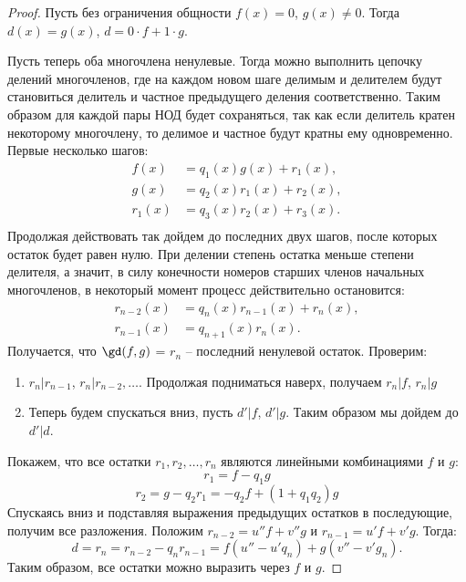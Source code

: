\begin{proof}
    Пусть без ограничения общности $f(x) = 0$, $g(x) \neq 0$. Тогда $d(x) = g(x)$, $d = 0\cdot f + 1\cdot g$.

    Пусть теперь оба многочлена ненулевые. Тогда можно выполнить цепочку делений многочленов, где 
    на каждом новом шаге делимым и делителем будут становиться делитель и частное предыдущего деления
    соответственно. Таким образом для каждой пары НОД будет сохраняться, так как если делитель кратен 
    некоторому многочлену, то делимое и частное будут кратны ему одновременно. Первые несколько шагов:
    \begin{align*}
        f(x)   & = q_1(x)g(x) + r_1(x), \\
        g(x)   & = q_2(x)r_1(x) + r_2(x), \\
        r_1(x) & = q_3(x)r_2(x) + r_3(x). \\
    \end{align*}
    Продолжая действовать так дойдем до последних двух шагов, после которых остаток будет равен нулю.
    При делении степень остатка меньше степени делителя, а значит, в силу конечности номеров старших 
    членов начальных многочленов, в некоторый момент процесс действительно остановится:
    \begin{align*}
        r_{n-2}(x) & = q_n(x)r_{n-1}(x) + r_n(x), \\
        r_{n-1}(x) & = q_{n+1}(x)r_{n}(x).
    \end{align*}
    Получается, что $\gd(f, g)$ = $r_n$ -- последний ненулевой остаток. Проверим:
    \begin{enumerate}
        \item $r_n \vert r_{n-1}$, $r_n \vert r_{n-2}, \ldots$. 
        Продолжая подниматься наверх, получаем $r_n \vert f$, $r_n \vert g$
        \item Теперь будем спускаться вниз, пусть $d' \vert f$, $d' \vert g$. 
        Таким образом мы дойдем до $d' \vert d$.
    \end{enumerate}
    Покажем, что все остатки $r_1, r_2, \ldots, r_n$ являются линейными комбинациями $f$ и $g$:
    $$r_1 = f - q_1g$$
    $$r_2 = g - q_2r_1 = -q_2f + (1 + q_1q_2)g$$
    Спускаясь вниз и подставляя выражения предыдущих остатков в последующие, получим все разложения.
    Положим $r_{n-2} = u''f + v''g$ и $r_{n-1} = u'f + v'g$. Тогда:
    $$d = r_n = r_{n-2} - q_n r_{n-1} = f(u'' - u'q_n) + g(v'' - v'g_n).$$
    Таким образом, все остатки можно выразить через $f$ и $g$.
\end{proof}

